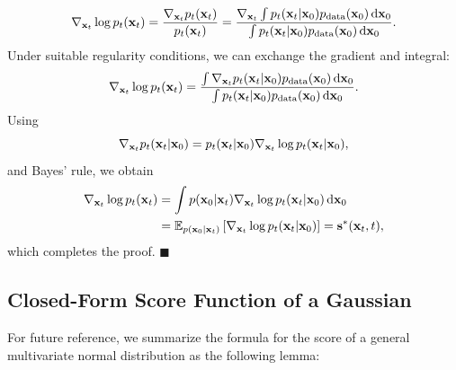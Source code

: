 \begin{align*}
\nabla_{{\mathbf{x}}_t} \log p_t({\mathbf{x}}_t) 
= \frac{\nabla_{{\mathbf{x}}_t} p_t({\mathbf{x}}_t)}{p_t({\mathbf{x}}_t)}
= \frac{\nabla_{{\mathbf{x}}_t} \int p_t({\mathbf{x}}_t | {\mathbf{x}}_0) 
p_{\text{data}}({\mathbf{x}}_0)   \mathop{}\!\mathrm{d}{\mathbf{x}}_0}
{\int p_t({\mathbf{x}}_t | {\mathbf{x}}_0) 
p_{\text{data}}({\mathbf{x}}_0)   \mathop{}\!\mathrm{d}{\mathbf{x}}_0}.
\end{align*}
Under suitable regularity conditions, we can exchange the gradient and integral:
\begin{align*}
\nabla_{{\mathbf{x}}_t} \log p_t({\mathbf{x}}_t) 
= \frac{\int \nabla_{{\mathbf{x}}_t} p_t({\mathbf{x}}_t | {\mathbf{x}}_0) 
p_{\text{data}}({\mathbf{x}}_0)   \mathop{}\!\mathrm{d}{\mathbf{x}}_0}
{\int p_t({\mathbf{x}}_t | {\mathbf{x}}_0) 
p_{\text{data}}({\mathbf{x}}_0)   \mathop{}\!\mathrm{d}{\mathbf{x}}_0}.
\end{align*}
Using
\[
\nabla_{{\mathbf{x}}_t}p_t({\mathbf{x}}_t|{\mathbf{x}}_0)
=
p_t({\mathbf{x}}_t|{\mathbf{x}}_0)
\nabla_{{\mathbf{x}}_t}\log p_t({\mathbf{x}}_t|{\mathbf{x}}_0),
\]
and Bayes' rule, we obtain
\begin{align*}
\nabla_{{\mathbf{x}}_t}\log p_t({\mathbf{x}}_t)
&=
\int
p({\mathbf{x}}_0|{\mathbf{x}}_t)
\nabla_{{\mathbf{x}}_t}\log p_t({\mathbf{x}}_t|{\mathbf{x}}_0)
\mathop{}\!\mathrm{d}{\mathbf{x}}_0 \\
&=
\mathbb{E}_{p({\mathbf{x}}_0|{\mathbf{x}}_t)}
\left[
\nabla_{{\mathbf{x}}_t}\log p_t({\mathbf{x}}_t|{\mathbf{x}}_0)
\right]
=
\mathbf{s}^*({\mathbf{x}}_t,t),
\end{align*}
which completes the proof.
\hfill$\blacksquare$



\subsection{Closed-Form Score Function of a Gaussian}

For future reference, we summarize the formula for the score of a general multivariate normal distribution as the following lemma:

